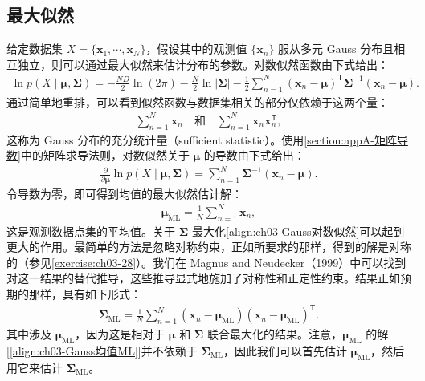 \documentclass[../../main.tex]{subfiles}
\begin{document}
\subsection{最大似然}\label{subsection:ch03-最大似然}

给定数据集 $X=\{\boldsymbol{x}_1,\cdots,\boldsymbol{x}_N\}$，假设其中的观测值 $\{\boldsymbol{x}_n\}$ 服从多元 Gauss 分布且相互独立，则可以通过最大似然来估计分布的参数。对数似然函数由下式给出：
\begin{align}
\ln p(X\mid\boldsymbol{\mu},\boldsymbol{\Sigma})=-\frac{ND}{2}\ln(2\pi)-\frac{N}{2}\ln\lvert\boldsymbol{\Sigma}\rvert-\frac{1}{2}\sum_{n=1}^{N}(\boldsymbol{x}_n-\boldsymbol{\mu})^{\mathsf{T}}\boldsymbol{\Sigma}^{-1}(\boldsymbol{x}_n-\boldsymbol{\mu}).
\label{align:ch03-Gauss对数似然}
\end{align}
通过简单地重排，可以看到似然函数与数据集相关的部分仅依赖于这两个量：
\begin{align}
\sum_{n=1}^{N}\boldsymbol{x}_n \quad\text{和}\quad \sum_{n=1}^{N}\boldsymbol{x}_n\boldsymbol{x}_n^{\mathsf{T}},
\label{align:ch03-Gauss充分统计量}
\end{align}
这称为 Gauss 分布的充分统计量（sufficient statistic）。使用\cref{section:appA-矩阵导数}中的矩阵求导法则，对数似然关于 $\boldsymbol{\mu}$ 的导数由下式给出：
\begin{align}
\frac{\partial}{\partial\boldsymbol{\mu}}\ln p(X\mid\boldsymbol{\mu},\boldsymbol{\Sigma})=\sum_{n=1}^{N}\boldsymbol{\Sigma}^{-1}(\boldsymbol{x}_n-\boldsymbol{\mu}).
\label{align:ch03-Gauss均值导数}
\end{align}
令导数为零，即可得到均值的最大似然估计解：
\begin{align}
\boldsymbol{\mu}_{\mathrm{ML}}=\frac{1}{N}\sum_{n=1}^{N}\boldsymbol{x}_n,
\label{align:ch03-Gauss均值ML}
\end{align}
这是观测数据点集的平均值。关于 $\boldsymbol{\Sigma}$ 最大化\eqref{align:ch03-Gauss对数似然}可以起到更大的作用。最简单的方法是忽略对称约束，正如所要求的那样，得到的解是对称的（参见\cref{exercise:ch03-28}）。我们在 Magnus and Neudecker（1999）中可以找到对这一结果的替代推导，这些推导显式地施加了对称性和正定性约束。结果正如预期的那样，具有如下形式：
\begin{align}
\boldsymbol{\Sigma}_{\mathrm{ML}}=\frac{1}{N}\sum_{n=1}^{N}(\boldsymbol{x}_n-\boldsymbol{\mu}_{\mathrm{ML}})(\boldsymbol{x}_n-\boldsymbol{\mu}_{\mathrm{ML}})^{\mathsf{T}}.
\label{align:ch03-Gauss协方差ML}
\end{align}
其中涉及 $\boldsymbol{\mu}_{\mathrm{ML}}$，因为这是相对于 $\boldsymbol{\mu}$ 和 $\boldsymbol{\Sigma}$ 联合最大化的结果。注意，$\boldsymbol{\mu}_{\mathrm{ML}}$ 的解[\eqref{align:ch03-Gauss均值ML}]并不依赖于 $\boldsymbol{\Sigma}_{\mathrm{ML}}$，因此我们可以首先估计 $\boldsymbol{\mu}_{\mathrm{ML}}$，然后用它来估计 $\boldsymbol{\Sigma}_{\mathrm{ML}}$。
\end{document}
